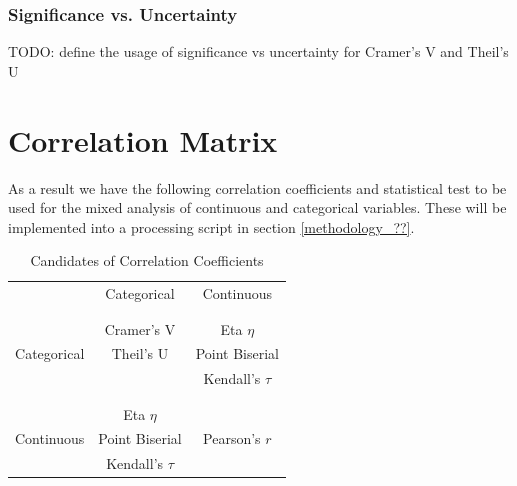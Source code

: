 \documentclass[a4paper,12pt]{report}
\begin{document}
\subsubsection{Significance vs. Uncertainty}
\label{correlation_significance_uncertainty}

TODO: define the usage of significance vs uncertainty for Cramer's V and Theil's U

\section{Correlation Matrix}

As a result we have the following correlation coefficients and statistical test to be used for the mixed analysis of continuous and categorical variables. These will be implemented into a processing script in section \ref{methodology_??}.

\bigskip

\begin{table}[ht]
	\centering
	\begin{tabular}{c|c|c}
					& Categorical 		& Continuous\\
		\\[-1em]
		\hline
		\\[-1em]
		 			& Cramer’s V  	& Eta $\eta$	\\
		Categorical	& Theil’s U		& Point Biserial\\
					& 				& Kendall's $\tau$\\
		\\[-1em]
		\hline
		\\[-1em]
					& Eta $\eta$		  			& \\
		Continuous	& Point Biserial		& Pearson's $r$\\
				& Kendall's $\tau$		& \\
	\end{tabular}
	\caption{\label{tab:table-name}Candidates of Correlation Coefficients}
\end{table}
	
\end{document}
